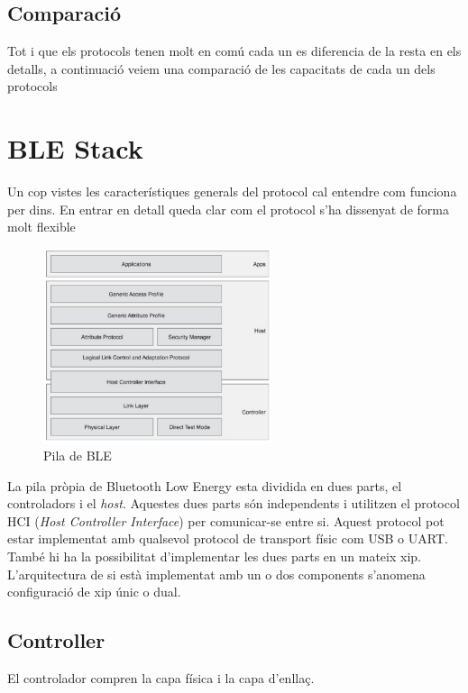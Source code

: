\subsection{Comparació}
Tot i que els protocols tenen molt en comú cada un es diferencia de la resta en els detalls, a continuació veiem una comparació de les capacitats de cada un dels protocols

\section{BLE Stack}
Un cop vistes les característiques generals del protocol cal entendre com funciona per dins.
En entrar en detall queda clar com el protocol s'ha dissenyat de forma molt flexible 

\begin{figure}[h!]
	\begin{center}
		\includegraphics[width=0.6\textwidth]{./images/BLE_Stack.png}
		\caption{Pila de BLE \cite{ble_stack}}
		\label{ble_stack}
	\end{center}
\end{figure}

La pila pròpia de Bluetooth Low Energy esta dividida en dues parts, el controladors i el \textit{host}. Aquestes dues parts són independents i utilitzen el protocol HCI (\textit{Host Controller Interface}) per comunicar-se entre si. Aquest protocol pot estar implementat amb qualsevol protocol de transport físic com USB o UART. També hi ha la possibilitat d'implementar les dues parts en un mateix xip. L'arquitectura de si està implementat amb un o dos components s'anomena configuració de xip únic o dual.


\subsection{Controller}
El controlador compren la capa física i la capa d'enllaç.

